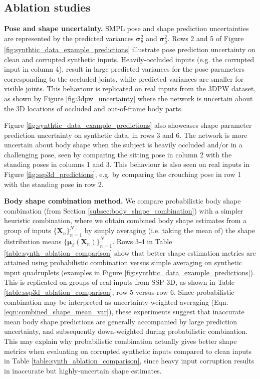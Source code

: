 \documentclass[final]{cvpr}
\begin{document}
\subsection{Ablation studies}

\noindent \textbf{Pose and shape uncertainty.} SMPL pose and shape prediction uncertainties are represented by the predicted variances $\boldsymbol{\sigma}^2_\theta$ and $\boldsymbol{\sigma}^2_\beta$. Rows 2 and 5 of Figure \ref{fig:synthtic_data_example_predictions} illustrate pose prediction uncertainty on clean and corrupted synthetic inputs. Heavily-occluded inputs (e.g. the corrupted input in column 4), result in large predicted variances for the pose parameters corresponding to the occluded joints, while predicted variances are smaller for visible joints. This behaviour is replicated on real inputs from the 3DPW dataset, as shown by Figure \ref{fig:3dpw_uncertainty} where the network is uncertain about the 3D locations of occluded and out-of-frame body parts.

Figure \ref{fig:synthtic_data_example_predictions} also showcases shape parameter prediction uncertainty on synthetic data, in rows 3 and 6. The network is more uncertain about body shape when the subject is heavily occluded and/or in a challenging pose, seen by comparing the sitting pose in column 2 with the standing poses in columns 1 and 3. This behaviour is also seen on real inputs in Figure \ref{fig:ssp3d_predictions}, e.g. by comparing the crouching pose in row 1 with the standing pose in row 2.

\noindent \textbf{Body shape combination method.} We compare probabilistic body shape combination (from Section \ref{subsec:body_shape_combination}) with a simpler heuristic combination, where we obtain combined body shape estimates from a group of inputs $\{\mathbf{X}_n\}_{n=1}^N$ by simply averaging (i.e. taking the mean of) the shape distribution means $\{\boldsymbol{\mu}_\beta(\mathbf{X}_n)\}_{n=1}^N$. Rows 3-4 in Table \ref{table:synth_ablation_comparison} show that better shape estimation metrics are attained using probabilistic combination versus simple averaging on synthetic input quadruplets (examples in Figure \ref{fig:synthtic_data_example_predictions}). This is replicated on groups of real inputs from SSP-3D, as shown in Table \ref{table:ssp3d_ablation_comparison}, row 5 versus row 6. Since probabilistic combination may be interpreted as uncertainty-weighted averaging (Eqn. \ref{eqn:combined_shape_mean_var}), these experiments suggest that inaccurate mean body shape predictions are generally accompanied by large prediction uncertainty, and subsequently down-weighted during probabilistic combination. This may explain why probabilistic combination actually gives better shape metrics when evaluating on corrupted synthetic inputs compared to clean inputs in Table \ref{table:synth_ablation_comparison}, since heavy input corruption results in inaccurate but highly-uncertain shape estimates.
\end{document}
